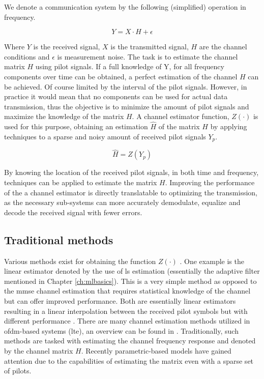 We denote a communication system by the following (simplified) operation in frequency.


\begin{equation}
    Y = X \cdot H + \epsilon
\end{equation}

Where $Y$ is the received signal, $X$ is the transmitted signal, $H$ are the channel conditions and $\epsilon$ is measurement noise. The task is to estimate the channel matrix $H$ using pilot signals. If a full knowledge of Y, for all frequency components over time can be obtained, a perfect estimation of the channel $H$ can be achieved. Of course limited by the interval of the pilot signals. However, in practice it would mean that no components can be used for actual data transmission, thus the objective is to minimize the amount of pilot signals and maximize the knowledge of the matrix $H$. A channel estimator function, $Z(\cdot)$ is used for this purpose, obtaining an estimation $\hat{H}$ of the matrix $H$ by applying techniques to a sparse and noisy amount of received pilot signals $Y_p$. 

\begin{equation}
    \hat{H} = Z(Y_p)
\end{equation}

By knowing the location of the received pilot signals, in both time and frequency, techniques can be applied to estimate the matrix $H$. Improving the performance of the a channel estimator is directly translatable to optimizing the transmission, as the necessary sub-systems can more accurately demodulate, equalize and decode the received signal with fewer errors.


\subsection{Traditional methods}

Various methods exist for obtaining the function $Z(\cdot)$ \cite{Oyerinde2012ReviewSystems}. One example is the linear estimator denoted by the use of \gls{ls} estimation (essentially the adaptive filter mentioned in Chapter \ref{ch:mlbasics}). This is a very simple method as opposed to the \gls{mmse} channel estimation that requires statistical knowledge of the channel but can offer improved performance. Both are essentially linear estimators resulting in a linear interpolation between the received pilot symbols but with different performance \cite{Cho2010MIMO-OFDMMATLAB}. There are many channel estimation methods utilized in \gls{ofdm}-based systems (\gls{lte}), an overview can be found in \cite{Liu2014ChannelOFDM}. Traditionally, such methods are tasked with estimating the channel frequency response and denoted by the channel matrix $H$. Recently parametric-based models have gained attention due to the capabilities of estimating the matrix even with a sparse set of pilots.


